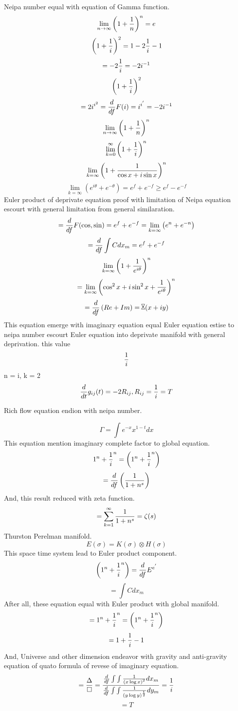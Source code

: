 \documentclass{jsarticle}
\begin{document}
  Neipa number equal with equation of Gamma function.
  $$ \lim_{n \to \infty}{\left({1 + {1 \over n}}\right)}^n = e $$
  $$ {\left({1 + {1 \over i}}\right)}^{2} = 1 -2{1 \over i} -1 $$
  $$ = -2{1 \over i} = -2 i^{-1} $$
  $$ {\left({1 + {1 \over i}}\right)}^{2} $$
  $$ = 2i^{i^{2}} = {d \over {d f}}F(i) = i^{i^{'}} = -2 i^{-1} $$
  $$  \lim_{n \to \infty}{\left({1 + {1 \over n}}\right)}^n $$
  $$ \lim_{k=0}^{\infty} {\left({1 + {1 \over i}}\right)}^{n} $$
  $$  \lim_{k=\infty} {\left({1 + {1 \over {\cos x +
  i\sin x}}}\right)}^{n} $$
  $$ \lim_{k=\infty}\left({e^{i\theta} + e^{-\theta}}\right) = 
  e^{f} + e^{-f} \ge e^{f} - e^{-f} $$
  Euler product of deprivate equation proof with limitation of
  Neipa equation escourt with general limitation from general similaration.
  $$ = {d \over {d f}}F(\cos,\sin) = e^{f} + e^{-f} = 
  \lim_{k=\infty}\left({e^{n} + e^{-n}}\right) $$ 
  $$ = {d \over {d f}}\int C dx_m = e^{f} + e^{-f} $$
  $$\lim_{k=\infty} {\left({1 + {1 \over {e^{i\theta}}}}\right)}^{n} $$
  $$ =  \lim_{k=\infty} {\left({{\cos^2 x + i\sin^2 x} + 
  {1 \over{e^{i\theta}}}}\right)}^{n} $$
  $$ = {d \over {d f}}\left({Re + Im}\right) = \timebow(x + iy) $$
  This equation emerge with imaginary equation equal Euler equation
  estise to neipa number escourt Euler equation into deprivate manifold
  with general deprivation.
  this value $$ {1 \over i} $$ 
  n = i, k = 2
  $$ {d \over {dt}}g_{ij}(t) = - 2 R_{ij}, R_{ij} = {1 \over i} = T  $$

  Rich flow equation endion with neipa number.


  $$ \Gamma = \int e^{-x}x^{1 - t}dx $$
  This equation mention imaginary complete factor to global equation.
  $$ 1^n + {1 \over i}^n = \left(1^n + {1 \over i}^n\right) $$
  $$ = {d \over {d f}}\left({1 \over {1 + n^s}}\right) $$
  And, this result reduced with zeta function.
  $$ = \sum_{k=1}^{\infty}{1 \over {1 + n^s}} = \zeta(s) $$
  Thurston Perelman manifold.
  $$ E(\sigma) = K(\sigma) \otimes H(\sigma) $$
  This space time system lead to Euler product component.
  $$ \left(1^n + {1 \over i}^n\right) = {d \over {d f}}E^{e^{'}} $$
  $$ = \int C dx_m $$
  After all, these equation equal with Euler product with global manifold.
  $$ = 1^n + {1 \over i}^n = \left(1^n + {1 \over i}^n\right) $$
  $$ = 1 + {1 \over i} - 1 $$
  And, Universe and other dimension endeavor with gravity and anti-gravity
  equation of quato formula of revese of imaginary equation.
  $$ = {{\Delta \over \square}} = {{{d \over {d f}}\int\int{
	  1 \over {(x \log x)}^2}dx_m \over {{d \over {d f}}\int\int
  {1 \over {(y\log y)^{1 \over 2}}}dy_m}}} = {1 \over i} $$
  $$ = T $$
\end{document}
